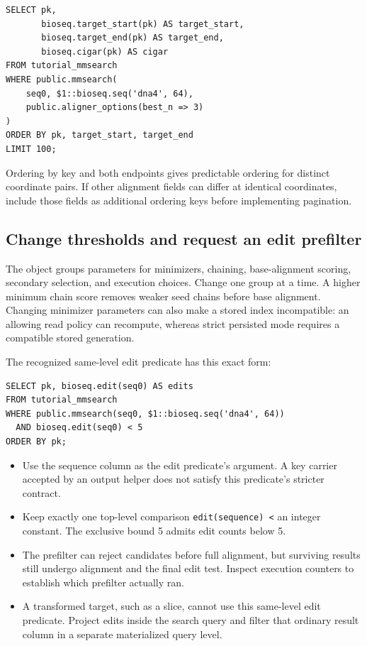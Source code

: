 \par\noindent\begin{minipage}{\linewidth}
\begin{lstlisting}[style=bioseq-appendix-sql]
SELECT pk,
       bioseq.target_start(pk) AS target_start,
       bioseq.target_end(pk) AS target_end,
       bioseq.cigar(pk) AS cigar
FROM tutorial_mmsearch
WHERE public.mmsearch(
    seq0, $1::bioseq.seq('dna4', 64),
    public.aligner_options(best_n => 3)
)
ORDER BY pk, target_start, target_end
LIMIT 100;
\end{lstlisting}
\end{minipage}

Ordering by key and both endpoints gives predictable ordering for distinct
coordinate pairs. If other alignment fields can differ at identical
coordinates, include those fields as additional ordering keys before
implementing pagination.

\subsection{Change thresholds and request an edit prefilter}

The object groups parameters for minimizers, chaining, base-alignment
scoring, secondary selection, and execution choices. Change one group at a
time. A higher minimum chain score removes weaker seed chains before base
alignment. Changing minimizer parameters can also make a stored index
incompatible: an allowing read policy can recompute, whereas strict persisted
mode requires a compatible stored generation.

The recognized same-level edit predicate has this exact form:

\par\noindent\begin{minipage}{\linewidth}
\begin{lstlisting}[style=bioseq-appendix-sql]
SELECT pk, bioseq.edit(seq0) AS edits
FROM tutorial_mmsearch
WHERE public.mmsearch(seq0, $1::bioseq.seq('dna4', 64))
  AND bioseq.edit(seq0) < 5
ORDER BY pk;
\end{lstlisting}
\end{minipage}

\begin{itemize}
  \item Use the sequence column as the edit predicate's argument. A key
    carrier accepted by an output helper does not satisfy this predicate's
    stricter contract.
  \item Keep exactly one top-level comparison \texttt{edit(sequence) <}
    an integer constant. The exclusive bound 5 admits edit counts below 5.
  \item The prefilter can reject candidates before full alignment, but
    surviving results still undergo alignment and the final edit test.
    Inspect execution counters to establish which prefilter actually ran.
  \item A transformed target, such as a slice, cannot use this same-level
    edit predicate. Project edits inside the search query and filter that
    ordinary result column in a separate materialized query level.
\end{itemize}


